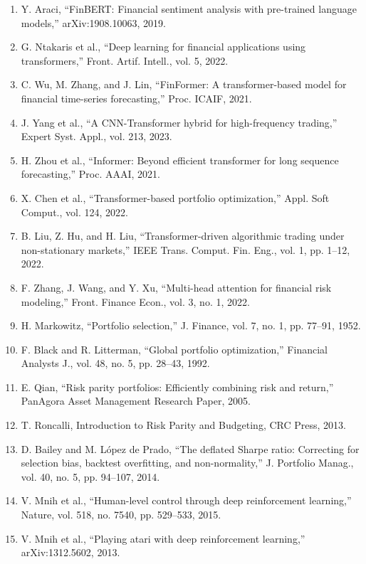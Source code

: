 \documentclass[11pt]{article}
\begin{document}
\begin{enumerate}
\item Y. Araci, ``FinBERT: Financial sentiment analysis with pre-trained language models,'' arXiv:1908.10063, 2019.

\item G. Ntakaris et al., ``Deep learning for financial applications using transformers,'' Front. Artif. Intell., vol. 5, 2022.

\item C. Wu, M. Zhang, and J. Lin, ``FinFormer: A transformer-based model for financial time-series forecasting,'' Proc. ICAIF, 2021.

\item J. Yang et al., ``A CNN-Transformer hybrid for high-frequency trading,'' Expert Syst. Appl., vol. 213, 2023.

\item H. Zhou et al., ``Informer: Beyond efficient transformer for long sequence forecasting,'' Proc. AAAI, 2021.

\item X. Chen et al., ``Transformer-based portfolio optimization,'' Appl. Soft Comput., vol. 124, 2022.

\item B. Liu, Z. Hu, and H. Liu, ``Transformer-driven algorithmic trading under non-stationary markets,'' IEEE Trans. Comput. Fin. Eng., vol. 1, pp. 1--12, 2022.

\item F. Zhang, J. Wang, and Y. Xu, ``Multi-head attention for financial risk modeling,'' Front. Finance Econ., vol. 3, no. 1, 2022.

\item H. Markowitz, ``Portfolio selection,'' J. Finance, vol. 7, no. 1, pp. 77--91, 1952.

\item F. Black and R. Litterman, ``Global portfolio optimization,'' Financial Analysts J., vol. 48, no. 5, pp. 28--43, 1992.

\item E. Qian, ``Risk parity portfolios: Efficiently combining risk and return,'' PanAgora Asset Management Research Paper, 2005.

\item T. Roncalli, Introduction to Risk Parity and Budgeting, CRC Press, 2013.

\item D. Bailey and M. López de Prado, ``The deflated Sharpe ratio: Correcting for selection bias, backtest overfitting, and non-normality,'' J. Portfolio Manag., vol. 40, no. 5, pp. 94--107, 2014.

\item V. Mnih et al., ``Human-level control through deep reinforcement learning,'' Nature, vol. 518, no. 7540, pp. 529--533, 2015.

\item V. Mnih et al., ``Playing atari with deep reinforcement learning,'' arXiv:1312.5602, 2013.
\end{enumerate}
\end{document}
